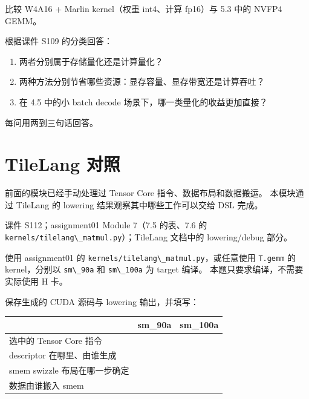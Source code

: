 \documentclass[11pt,a4paper,fontset=none]{ctexart}
\providecommand{\passthrough}[1]{#1}
\begin{document}

比较 W4A16 + Marlin kernel（权重 int4、计算 fp16）与 5.3 中的 NVFP4
GEMM。

根据课件 S109 的分类回答：

\begin{enumerate}
\def\labelenumi{(\alph{enumi})}
\item
  两者分别属于存储量化还是计算量化？
\item
  两种方法分别节省哪些资源：显存容量、显存带宽还是计算吞吐？
\item
  在 4.5 中的小 batch decode 场景下，哪一类量化的收益更加直接？
\end{enumerate}

每问用两到三句话回答。

\hypertarget{tilelang-ux5bf9ux7167}{%
\section{TileLang 对照}\label{tilelang-ux5bf9ux7167}}

前面的模块已经手动处理过 Tensor Core 指令、数据布局和数据搬运。
本模块通过 TileLang 的 lowering 结果观察其中哪些工作可以交给 DSL 完成。

\begin{reading}

课件 S112；assignment01 Module 7（7.5 的表、7.6 的
\passthrough{\lstinline!kernels/tilelang\_matmul.py!}）；TileLang
文档中的 lowering/debug 部分。

\end{reading}


使用 assignment01 的
\passthrough{\lstinline!kernels/tilelang\_matmul.py!}，或任意使用
\passthrough{\lstinline!T.gemm!} 的 kernel，分别以
\passthrough{\lstinline!sm\_90a!} 和 \passthrough{\lstinline!sm\_100a!}
为 target 编译。 本题只要求编译，不需要实际使用 H 卡。

保存生成的 CUDA 源码与 lowering 输出，并填写：

\begin{longtable}[]{@{}lll@{}}
\toprule\noalign{}
& sm\_90a & sm\_100a \\
\midrule\noalign{}
\endhead
\bottomrule\noalign{}
\endlastfoot
选中的 Tensor Core 指令 & & \\
descriptor 在哪里、由谁生成 & & \\
smem swizzle 布局在哪一步确定 & & \\
数据由谁搬入 smem & & \\
\end{longtable}
\end{document}
